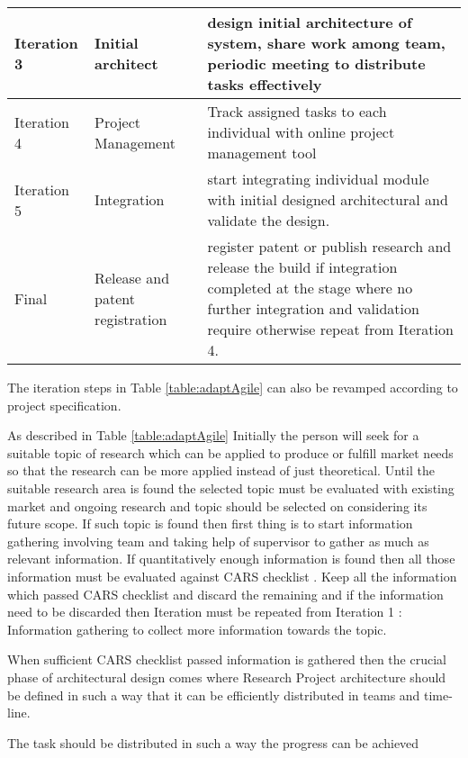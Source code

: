 \begin{table*}[t]
\begin{center}
\begin{tabular}{|p{3cm}|p{4cm}|p{8cm}|}
			Iteration 3 & Initial architect & design initial architecture of system, share work among team, periodic meeting to distribute tasks effectively
			\\ \hline
			Iteration 4 & Project Management & Track assigned tasks to each individual with online project management tool
			\\ \hline
			Iteration 5 & Integration & start integrating individual module with initial designed architectural and validate the design.
			\\ \hline
			Final & Release and patent registration & register patent or publish research and release the build if integration completed at the stage where no further integration and validation require otherwise repeat from Iteration 4.
			\\ \hline
		\end{tabular}
		\label{table:adaptAgile}
	\end{center}
\end{table*}
The iteration steps in Table \ref{table:adaptAgile} can also be revamped according to project specification.

As described in Table \ref{table:adaptAgile} Initially the person will seek for a suitable topic of research which can be applied to produce or fulfill market needs so that the research can be more applied instead of just theoretical. Until the suitable research area is found the selected topic must be evaluated with existing market and ongoing research and topic should be selected on considering its future scope. If such topic is found then first thing is to start information gathering involving team and taking help of supervisor to gather as much as relevant information. If quantitatively enough information is found then all those information must be evaluated against CARS checklist \cite{cars-checklist}. Keep all the information which passed CARS checklist and discard the remaining and if the information need to be discarded then Iteration must be repeated from Iteration 1 : Information gathering to collect more information towards the topic. 

When sufficient CARS checklist passed information is gathered then the crucial phase of architectural design comes where Research Project architecture should be defined in such a way that it can be efficiently distributed in teams and time-line. 

The task should be distributed in such a way the progress can be achieved 

